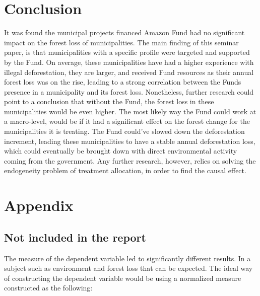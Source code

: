 \documentclass[11pt, oneside]{article}   	%
\begin{document}
\cleardoublepage


\section{Conclusion}
It was found the municipal projects financed Amazon Fund had no significant impact on the forest loss of municipalities. The main finding of this seminar paper, is that municipalities with a specific profile were targeted and supported by the Fund. On average, these municipalities have had a higher experience with illegal deforestation, they are larger, and received Fund resources as their annual forest loss was on the rise, leading to a strong correlation between the Funds presence in a municipality and its forest loss. Nonetheless, further research could point to a conclusion that without the Fund, the forest loss in these municipalities would be even higher. The most likely way the Fund could work at a macro-level,  would be if it had a significant effect on the forest change for the municipalities it is treating. The Fund could've slowed down the deforestation increment, leading these municipalities to have a stable annual deforestation loss, which could eventually be brought down with direct environmental activity coming from the government. Any further research, however, relies on solving the endogeneity problem of treatment allocation, in order to find the causal effect.


\begin{appendix}
\listoffigures
\listoftables
\end{appendix}







\section{Appendix}
\subsection{Not included in the report}
The measure of the dependent variable led to significantly different results. In a subject such as environment and forest loss that can be expected. The ideal way of constructing the dependent variable would be using a normalized measure constructed as the following: 
\end{document}
